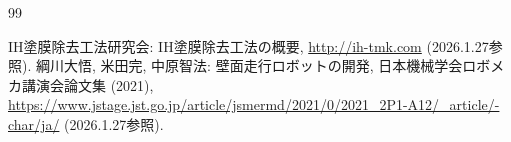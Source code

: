 \newpage
\begin{thebibliography}{99}

\setlength{\itemsep}{-2pt} 
 IH塗膜除去工法研究会: IH塗膜除去工法の概要, 
\url{http://ih-tmk.com} (2026.1.27参照).
 綱川大悟, 米田完, 中原智法: 壁面走行ロボットの開発, 日本機械学会ロボメカ講演会論文集 (2021), 
\url{https://www.jstage.jst.go.jp/article/jsmermd/2021/0/2021_2P1-A12/_article/-char/ja/} (2026.1.27参照).

\end{thebibliography}